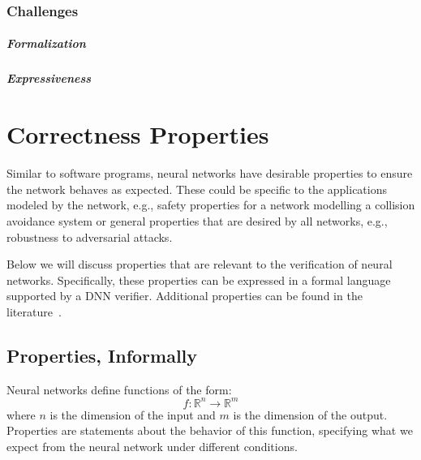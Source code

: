 \documentclass[oneside,11pt,dvipsnames]{book}
\begin{document}






\subsection{Challenges}

\paragraph{Formalization}


\paragraph{Expressiveness}


\chapter{Correctness Properties}

Similar to software programs, neural networks have desirable properties to ensure the network behaves as expected. These could be specific to the applications modeled by the network, e.g., safety properties for a network modelling a collision avoidance system or general properties that are desired by all networks, e.g., robustness to adversarial attacks. 

Below we will discuss properties that are relevant to the verification of neural networks. Specifically, these properties can be 
expressed in a formal language supported by a DNN verifier. Additional properties can be found in the literature~\cite{seshia2018formal}.

\section{Properties, Informally}

Neural networks define functions of the form:
\[
f: \mathbb{R}^{n} \to \mathbb{R}^{m}
\]
where $n$ is the dimension of the input and $m$ is the dimension of the output. Properties are statements about the behavior of this function, specifying what we expect from the neural network under different conditions.
\end{document}
